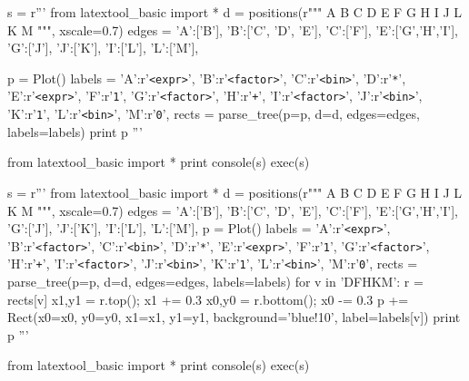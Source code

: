 \begin{python}
s = r'''
from latextool_basic import *
d = positions(r"""
   A
   B
C  D  E
F   G H I
    J   L
    K   M
""", xscale=0.7)
edges = {'A':['B'],          'B':['C', 'D', 'E'], 'C':['F'],
         'E':['G','H','I'],  'G':['J'],           'J':['K'],
         'I':['L'],          'L':['M'],
        }
        
p = Plot()
labels = {'A':r'\texttt{<expr>}',   'B':r'\texttt{<factor>}',
          'C':r'\texttt{<bin>}',    'D':r'\texttt{*}',
          'E':r'\texttt{<expr>}',   'F':r'\texttt{1}',
          'G':r'\texttt{<factor>}', 'H':r'\texttt{+}',
          'I':r'\texttt{<factor>}', 'J':r'\texttt{<bin>}',
          'K':r'\texttt{1}',        'L':r'\texttt{<bin>}',
          'M':r'\texttt{0}',
        }
rects = parse_tree(p=p, d=d, edges=edges, labels=labels)
print p
'''

from latextool_basic import *
print console(s)
exec(s)
\end{python}






\begin{python}
s = r'''
from latextool_basic import *
d = positions(r"""
   A
   B
C  D  E
F   G H I
    J   L
    K   M
""", xscale=0.7)
edges = {'A':['B'],          'B':['C', 'D', 'E'], 'C':['F'],
         'E':['G','H','I'],  'G':['J'],           'J':['K'],
         'I':['L'],          'L':['M'],
        }
p = Plot()
labels = {'A':r'\texttt{<expr>}',   'B':r'\texttt{<factor>}',
          'C':r'\texttt{<bin>}',    'D':r'\texttt{*}',
          'E':r'\texttt{<expr>}',   'F':r'\texttt{1}',
          'G':r'\texttt{<factor>}', 'H':r'\texttt{+}',
          'I':r'\texttt{<factor>}', 'J':r'\texttt{<bin>}',
          'K':r'\texttt{1}',        'L':r'\texttt{<bin>}',
          'M':r'\texttt{0}',
        }
rects = parse_tree(p=p, d=d, edges=edges, labels=labels)
for v in 'DFHKM':
    r = rects[v]
    x1,y1 = r.top(); x1 += 0.3
    x0,y0 = r.bottom(); x0 -= 0.3
    p += Rect(x0=x0, y0=y0, x1=x1, y1=y1, background='blue!10',
              label=labels[v])
print p
'''

from latextool_basic import *
print console(s)
exec(s)
\end{python}
